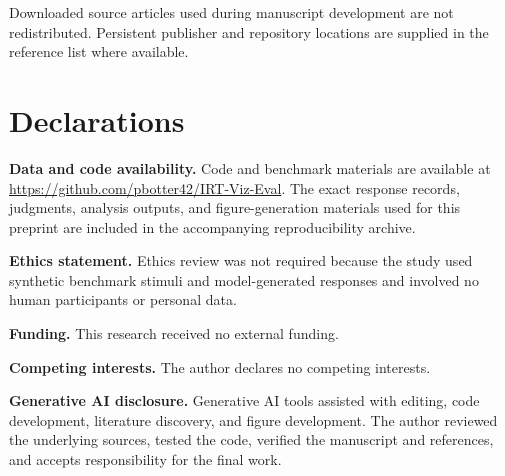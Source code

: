 \documentclass[12pt]{article}
\begin{document}
Downloaded source articles used during manuscript development are not redistributed. Persistent publisher and repository locations are supplied in the reference list where available.

\fi
\section{Declarations}

\noindent\textbf{Data and code availability.} Code and benchmark materials are available at \url{https://github.com/pbotter42/IRT-Viz-Eval}. The exact response records, judgments, analysis outputs, and figure-generation materials used for this preprint are included in the accompanying reproducibility archive.

\noindent\textbf{Ethics statement.} Ethics review was not required because the study used synthetic benchmark stimuli and model-generated responses and involved no human participants or personal data.

\noindent\textbf{Funding.} This research received no external funding.

\noindent\textbf{Competing interests.} The author declares no competing interests.

\noindent\textbf{Generative AI disclosure.} Generative AI tools assisted with editing, code development, literature discovery, and figure development. The author reviewed the underlying sources, tested the code, verified the manuscript and references, and accepts responsibility for the final work.



\end{document}

